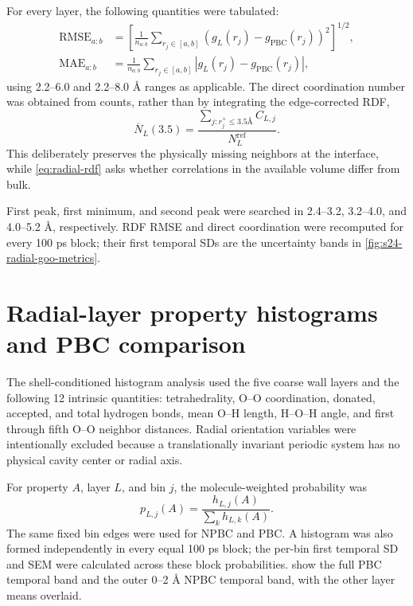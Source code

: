 \documentclass[11pt]{article}
\newcommand{\angstrom}{\text{\AA}}
\newcommand{\PBC}{\mathrm{PBC}}
\begin{document}
For every layer, the following quantities were tabulated:
\begin{align}
 \mathrm{RMSE}_{a:b}&=
 \left[\frac{1}{n_{a:b}}\sum_{r_j\in[a,b]}
 \left(g_L(r_j)-g_{\PBC}(r_j)\right)^2\right]^{1/2},\\
 \mathrm{MAE}_{a:b}&=
 \frac{1}{n_{a:b}}\sum_{r_j\in[a,b]}
 \left|g_L(r_j)-g_{\PBC}(r_j)\right|,
 \label{eq:rdf-errors}
\end{align}
using 2.2--6.0 and 2.2--8.0 \(\angstrom\) ranges as applicable.  The direct
coordination number was obtained from counts, rather than by integrating the
edge-corrected RDF,
\begin{equation}
 \overline N_L(3.5)=
 \frac{\sum_{j:r_j^+\leq3.5\angstrom}C_{L,j}}
 {N_L^{\mathrm{ref}}}.
 \label{eq:direct-layer-coord}
\end{equation}
This deliberately preserves the physically missing neighbors at the
interface, while \cref{eq:radial-rdf} asks whether correlations in the
available volume differ from bulk.

First peak, first minimum, and second peak were searched in 2.4--3.2,
3.2--4.0, and 4.0--5.2 \(\angstrom\), respectively.  RDF RMSE and direct
coordination were recomputed for every 100 ps block; their first temporal SDs
are the uncertainty bands in \cref{fig:s24-radial-goo-metrics}.

\section{Radial-layer property histograms and PBC comparison}

The shell-conditioned histogram analysis used the five coarse wall layers
and the following 12 intrinsic quantities: tetrahedrality, O--O coordination,
donated, accepted, and total hydrogen bonds, mean O--H length, H--O--H angle,
and first through fifth O--O neighbor distances.  Radial orientation variables
were intentionally excluded because a translationally invariant periodic
system has no physical cavity center or radial axis.

For property \(A\), layer \(L\), and bin \(j\), the molecule-weighted
probability was
\begin{equation}
 p_{L,j}(A)=\frac{h_{L,j}(A)}{\sum_k h_{L,k}(A)}.
 \label{eq:layer-hist}
\end{equation}
The same fixed bin edges were used for NPBC and PBC.  A histogram was also
formed independently in every equal 100 ps block; the per-bin first temporal
SD and SEM were calculated across these block probabilities.
 show the full PBC temporal band and the outer 0--2
\(\angstrom\) NPBC temporal band, with the other layer means overlaid.
\end{document}
